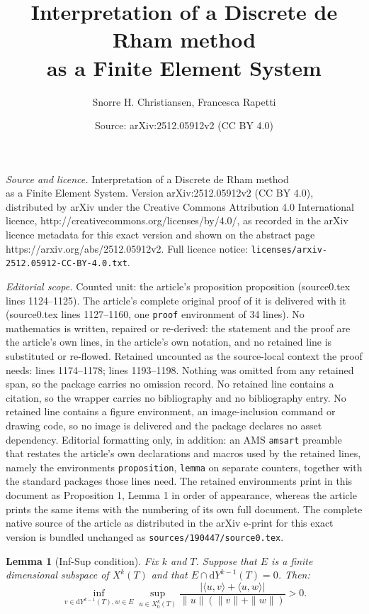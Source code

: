 \documentclass[10pt,a4paper]{amsart}
\title{Interpretation of a Discrete de Rham method \\ as a Finite Element System}
\author{Snorre H. Christiansen, Francesca Rapetti}
\date{Source: arXiv:2512.05912v2 (CC BY 4.0)}
\newtheorem{lemma}{Lemma}
\newcommand{\rmd}{\mathrm{d}}
\begin{document}
\maketitle

\noindent\emph{Source and licence.} Interpretation of a Discrete de Rham method \\ as a Finite Element System. Version arXiv:2512.05912v2 (CC BY 4.0), distributed by arXiv under the Creative Commons Attribution 4.0 International licence, http://creativecommons.org/licenses/by/4.0/, as recorded in the arXiv licence metadata for this exact version and shown on the abstract page https://arxiv.org/abs/2512.05912v2. Full licence notice: \texttt{licenses/arxiv-2512.05912-CC-BY-4.0.txt}.\par\smallskip

\noindent\textit{Editorial scope.} Counted unit: the article's proposition proposition (source0.tex lines 1124--1125). The article's complete original proof of it is delivered with it (source0.tex lines 1127--1160, one \texttt{proof} environment of 34 lines). No mathematics is written, repaired or re-derived: the statement and the proof are the article's own lines, in the article's own notation, and no retained line is substituted or re-flowed.  Retained uncounted as the source-local context the proof needs: lines 1174--1178; lines 1193--1198.  Nothing was omitted from any retained span, so the package carries no omission record.  No retained line contains a citation, so the wrapper carries no bibliography and no bibliography entry.  No retained line contains a figure environment, an image-inclusion command or drawing code, so no image is delivered and the package declares no asset dependency.  Editorial formatting only, in addition: an AMS \texttt{amsart} preamble that restates the article's own declarations and macros used by the retained lines, namely the environments \texttt{proposition}, \texttt{lemma} on separate counters, together with the standard packages those lines need.  The retained environments print in this document as Proposition 1, Lemma 1 in order of appearance, whereas the article prints the same items with the numbering of its own full document.  The complete native source of the article as distributed in the arXiv e-print for this exact version is bundled unchanged as \texttt{sources/190447/source0.tex}.
\begin{lemma}[Inf-Sup condition]\label{lem:infsup} Fix $k$ and $T$. Suppose that $E$ is a finite dimensional subspace of $X^k(T)$  and that $E \cap \rmd Y^{k-1}(T) = 0$. Then:
\begin{equation}
  \inf_{v \in \rmd Y^{k-1}(T), w \in E} \sup_{u\in X^k_0(T)} \frac{|\langle u, v \rangle + \langle u, w \rangle|}{\| u\| (\| v \| + \| w\|)} >0.
\end{equation}
\end{lemma}
\end{document}
